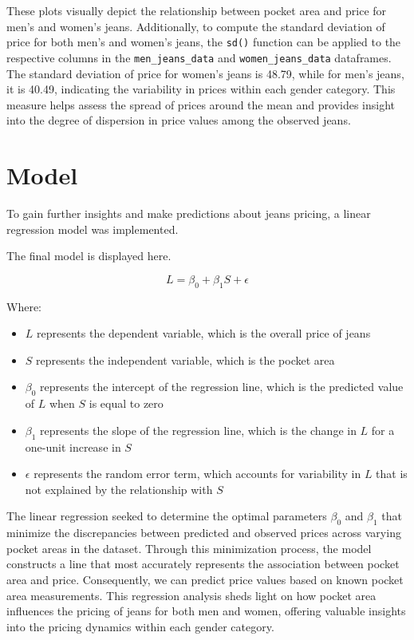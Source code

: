\documentclass[
  letterpaper,
  DIV=11,
  numbers=noendperiod]{scrartcl}
\providecommand{\tightlist}{%
  \setlength{\itemsep}{0pt}\setlength{\parskip}{0pt}}\usepackage{longtable,booktabs,array}
\begin{document}
These plots visually depict the relationship between pocket area and
price for men's and women's jeans. Additionally, to compute the standard
deviation of price for both men's and women's jeans, the \texttt{sd()}
function can be applied to the respective columns in the
\texttt{men\_jeans\_data} and \texttt{women\_jeans\_data} dataframes.
The standard deviation of price for women's jeans is 48.79, while for
men's jeans, it is 40.49, indicating the variability in prices within
each gender category. This measure helps assess the spread of prices
around the mean and provides insight into the degree of dispersion in
price values among the observed jeans.

\newpage

\hypertarget{model}{%
\section{Model}\label{model}}

To gain further insights and make predictions about jeans pricing, a
linear regression model was implemented.

The final model is displayed here.

\[L = \beta_0 + \beta_1S + \epsilon\]

Where:

\begin{itemize}
\tightlist
\item
  \(L\) represents the dependent variable, which is the overall price of
  jeans
\item
  \(S\) represents the independent variable, which is the pocket area
\item
  \(\beta_0\) represents the intercept of the regression line, which is
  the predicted value of \(L\) when \(S\) is equal to zero
\item
  \(\beta_1\) represents the slope of the regression line, which is the
  change in \(L\) for a one-unit increase in \(S\)
\item
  \(\epsilon\) represents the random error term, which accounts for
  variability in \(L\) that is not explained by the relationship with
  \(S\)
\end{itemize}

The linear regression seeked to determine the optimal parameters
\(\beta_0\) and \(\beta_1\) that minimize the discrepancies between
predicted and observed prices across varying pocket areas in the
dataset. Through this minimization process, the model constructs a line
that most accurately represents the association between pocket area and
price. Consequently, we can predict price values based on known pocket
area measurements. This regression analysis sheds light on how pocket
area influences the pricing of jeans for both men and women, offering
valuable insights into the pricing dynamics within each gender category.
\end{document}

